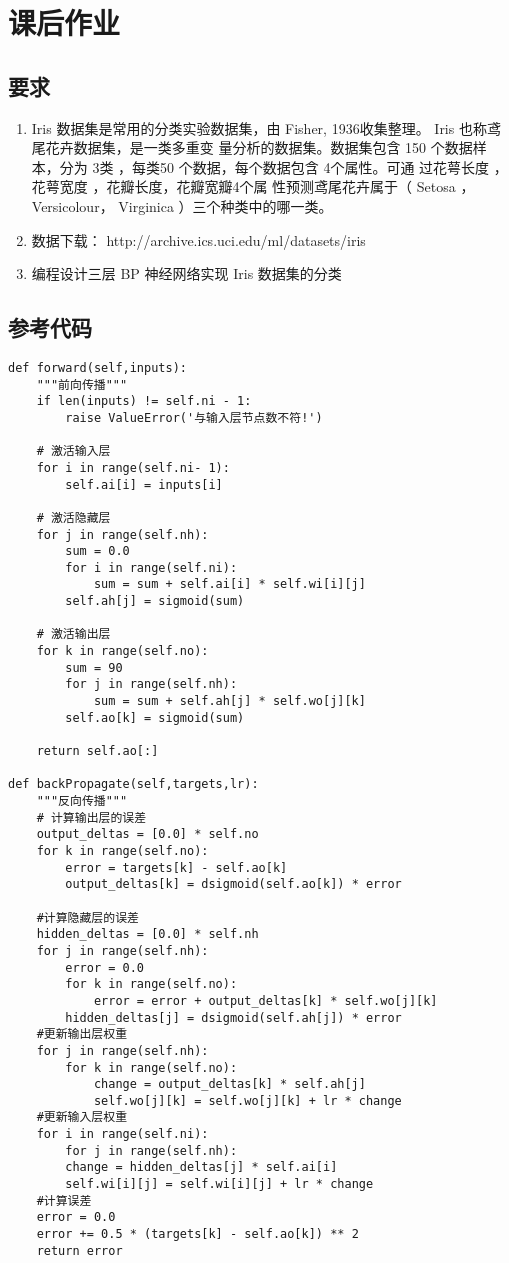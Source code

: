 \documentclass{article}
\date{\today}
\begin{document}
\section*{课后作业} %
\label{sec:课后作业}
	\subsection*{要求} %
	\label{sub:要求}
		\begin{enumerate}
			\item Iris 数据集是常用的分类实验数据集，由 Fisher, 1936收集整理。 Iris 也称鸢尾花卉数据集，是一类多重变 量分析的数据集。数据集包含 150 个数据样本，分为 3类 ，每类50 个数据，每个数据包含 4个属性。可通 过花萼长度 ，花萼宽度 ，花瓣长度，花瓣宽瓣4个属 性预测鸢尾花卉属于（ Setosa ，Versicolour， Virginica ）三个种类中的哪一类。
			\item 数据下载： http://archive.ics.uci.edu/ml/datasets/iris
			\item 编程设计三层 BP 神经网络实现 Iris 数据集的分类
		\end{enumerate}
	\subsection*{参考代码} %
	\label{sub:参考代码}

\begin{verbatim}
def forward(self,inputs):
	"""前向传播"""
	if len(inputs) != self.ni - 1:
		raise ValueError('与输入层节点数不符!')
	
	# 激活输入层
	for i in range(self.ni- 1):
		self.ai[i] = inputs[i]
	
	# 激活隐藏层
	for j in range(self.nh):
		sum = 0.0
		for i in range(self.ni):
			sum = sum + self.ai[i] * self.wi[i][j]
		self.ah[j] = sigmoid(sum)
	
	# 激活输出层
	for k in range(self.no):
		sum = 90
		for j in range(self.nh):
			sum = sum + self.ah[j] * self.wo[j][k]
		self.ao[k] = sigmoid(sum)
	
	return self.ao[:]

def backPropagate(self,targets,lr):
	"""反向传播"""
	# 计算输出层的误差
	output_deltas = [0.0] * self.no
	for k in range(self.no):
		error = targets[k] - self.ao[k]
		output_deltas[k] = dsigmoid(self.ao[k]) * error

	#计算隐藏层的误差
	hidden_deltas = [0.0] * self.nh
	for j in range(self.nh):
		error = 0.0
		for k in range(self.no):
			error = error + output_deltas[k] * self.wo[j][k]
		hidden_deltas[j] = dsigmoid(self.ah[j]) * error
	#更新输出层权重
	for j in range(self.nh):
		for k in range(self.no):
			change = output_deltas[k] * self.ah[j]
			self.wo[j][k] = self.wo[j][k] + lr * change
	#更新输入层权重
	for i in range(self.ni):
		for j in range(self.nh):
		change = hidden_deltas[j] * self.ai[i]
		self.wi[i][j] = self.wi[i][j] + lr * change
	#计算误差
	error = 0.0
	error += 0.5 * (targets[k] - self.ao[k]) ** 2
	return error
\end{verbatim}    
\end{document}
